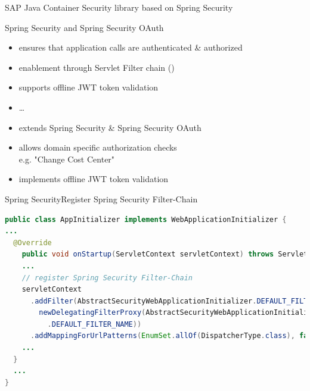 \begin{frame}[fragile,t]{SAP Java Container Security library} {based on Spring Security}

Spring Security and Spring Security OAuth
\begin{itemize}
	\item ensures that application calls are authenticated \& authorized
	\item enablement through Servlet Filter chain ()
	\item supports offline JWT token validation
	\item \ldots
\end{itemize}
\vfill
{}
\begin{itemize}
	\item extends Spring Security \& Spring Security OAuth
	\item allows domain specific authorization checks \\e.g. "Change Cost Center"
	\item implements offline JWT token validation
\end{itemize}
\end{frame}



\begin{frame}[fragile,t]{Spring Security}{Register Spring Security Filter-Chain}
\scriptsize
\begin{lstlisting}[language=java]
public class AppInitializer implements WebApplicationInitializer {
...
  @Override
    public void onStartup(ServletContext servletContext) throws ServletException {
    ...
    // register Spring Security Filter-Chain
    servletContext
      .addFilter(AbstractSecurityWebApplicationInitializer.DEFAULT_FILTER_NAME,
        newDelegatingFilterProxy(AbstractSecurityWebApplicationInitializer
          .DEFAULT_FILTER_NAME))
      .addMappingForUrlPatterns(EnumSet.allOf(DispatcherType.class), false, "/*");
    ...
  }
  ...
}
\end{lstlisting} 
\end{frame}

